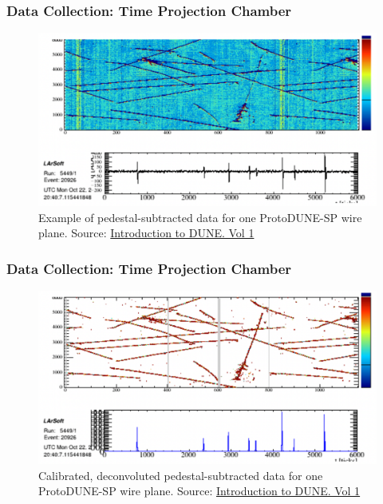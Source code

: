 \documentclass{beamer}
\begin{document}
\begin{frame}
	\frametitle{Data Collection: Time Projection Chamber}
	\begin{figure}[h!]
		\includegraphics[width=.8\textwidth]{images/data1.png}
		\caption{Example of pedestal-subtracted data for one ProtoDUNE-SP wire plane. Source: \href{https://arxiv.org/abs/2002.02967}{\color{blue} Introduction to DUNE. Vol 1}}
		\label{far_detector}
	\end{figure}
\end{frame}

\begin{frame}
	\frametitle{Data Collection: Time Projection Chamber}
	\begin{figure}[h!]
		\includegraphics[width=.8\textwidth]{images/data2.png}
		\caption{Calibrated, deconvoluted pedestal-subtracted data for one ProtoDUNE-SP wire plane. Source: \href{https://arxiv.org/abs/2002.02967}{\color{blue} Introduction to DUNE. Vol 1}}
		\label{far_detector}
	\end{figure}
\end{frame}

\end{document}

